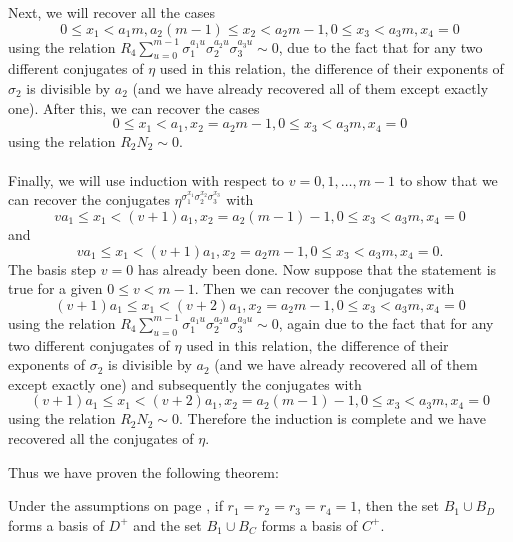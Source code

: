 Next, we will recover all the cases $$0\leq x_1 < a_1m, a_2(m-1)\leq x_2 < a_2m-1, 0\leq x_3 <a_3m,x_4=0$$
using the relation $R_4\sum_{u=0}^{m-1}\sigma_1^{a_1u}\sigma_2^{a_2u}\sigma_3^{a_3u}\sim 0$, due to the fact that for any two different conjugates of $\eta$ used in this relation, the difference of their exponents of $\sigma_2$ is divisible by $a_2$ (and we have already recovered all of them except exactly one).
 After this, we can recover the cases $$0\leq x_1 < a_1, x_2 = a_2m-1, 0\leq x_3 <a_3m,x_4=0$$ using the relation $R_2N_2\sim 0$.
\paragraph*{}
Finally, we will use induction with respect to $v=0,1,\dots, m-1$ to show that we can recover the conjugates $\eta^{\sigma_1^{x_1}\sigma_2^{x_2}\sigma_3^{x_3}}$ with $$va_1\leq x_1 < (v+1)a_1,x_2=a_2(m-1)-1,0\le x_3<a_3m,x_4=0$$ and $$va_1\leq x_1 < (v+1)a_1,x_2=a_2m-1,0\le x_3<a_3m,x_4=0.$$
The basis step $v=0$ has already been done. Now suppose that the statement is true for a given $0\leq v<m-1$. Then we can recover the conjugates with $$(v+1)a_1\leq x_1 < (v+2)a_1,x_2=a_2m-1,0\le x_3<a_3m,x_4=0$$
using the relation $R_4\sum_{u=0}^{m-1}\sigma_1^{a_1u}\sigma_2^{a_2u}\sigma_3^{a_3u}\sim 0$, again due to the fact that for any two different conjugates of $\eta$ used in this relation, the difference of their exponents of $\sigma_2$ is divisible by $a_2$ (and we have already recovered all of them except exactly one) and subsequently the conjugates with $$(v+1)a_1\leq x_1 < (v+2)a_1,x_2=a_2(m-1)-1,0\le x_3<a_3m,x_4=0$$ using the relation $R_2N_2\sim 0$.
Therefore the induction is complete and we have recovered all the conjugates of $\eta$. 

Thus we have proven the following theorem:
\begin{theorem}\label{th1}
Under the assumptions on page \pageref{assum}, if $r_1=r_2=r_3=r_4=1$, then the set $B_{1}\cup B_D$ forms a basis of $D^+$ and the set $B_{1}\cup B_C$ forms a basis of $C^+$.
\end{theorem}
